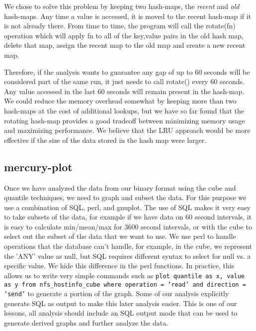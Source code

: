 We chose to solve this problem by keeping two hash-maps, the {\it
recent} and {\it old} hash-maps.  Any time a value is accessed, it is
moved to the recent hash-map if it is not already there.  From time to
time, the program will call the rotate(fn) operation which will apply
fn to all of the key,value pairs in the old hash map, delete that map,
assign the recent map to the old map and create a new recent map.

Therefore, if the analysis wants to guarantee any gap of up to 60
seconds will be considered part of the same run, it just needs to call
rotate() every 60 seconds.  Any value accessed in the last 60 seconds
will remain present in the hash-map.  We could reduce the memory
overhead somewhat by keeping more than two hash-maps at the cost of
additional lookups, but we have so far found that the rotating
hash-map provides a good tradeoff between minimizing memory usage and
maximizing performance.  We believe that the LRU approach would be
more effective if the size of the data stored in the hash map were
larger.

\subsection{mercury-plot}

Once we have analyzed the data from our binary format using the cube
and quantile techniques, we need to graph and subset the data.  For
this purpose we use a combination of SQL, perl, and gnuplot.  The use
of SQL makes it very easy to take subsets of the data, for example if
we have data on 60 second intervals, it is easy to calculate
min/mean/max for 3600 second intervals, or with the cube to select out
the subset of the data that we want to use.  We use perl to handle
operations that the database can't handle, for example, in the cube,
we represent the 'ANY' value as null, but SQL requires different
syntax to select for null vs. a specific value.  We hide this
difference in the perl functions.  In practice, this allows us to
write very simple commands such as {\tt plot quantile as x, value as y
from nfs\_hostinfo\_cube where operation = 'read' and direction =
'send'} to generate a portion of the graph.  Some of our analysis
explicitly generate SQL as output to make this later analysis easier.
This is one of our lessons, all analysis should include an SQL output
mode that can be used to generate derived graphs and further analyze
the data.
